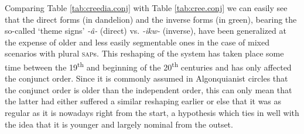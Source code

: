 \documentclass[twoside,a4paper,11pt]{article}
\newcommand{\ipa}[1]{{\phon\textit{#1}}}
\newcommand{\sg}{\textsc{sg}}
\newcommand{\pl}{\textsc{pl}}
\newcommand{\grise}[1]{\cellcolor{lightgray}\textbf{#1}}
\newcommand{\Σ}{\greek{Σ}}
\newcommand{\pli}{\textsc{pi}}
\newcommand{\pe}{\textsc{pe}}
\begin{document}

Comparing Table \vref{tab:creedia.conj} with Table \vref{tab:cree.conj} we can easily see that the direct forms (in dandelion) and the inverse forms (in green), bearing the so-called `theme signs' \textit{-â-} (direct) vs. \textit{-ikw-} (inverse), have been generalized at the expense of older and less easily segmentable ones in the case of mixed scenarios with plural \textsc{sap}s. This reshaping of the system has taken place some time between the 19\textsuperscript{th} and beginning of the 20\textsuperscript{th} centuries and has only affected the conjunct order. Since it is commonly assumed in Algonquianist circles that the conjunct order is older than the independent order, this can only mean that the latter had either suffered a similar reshaping earlier or else that it was as regular as it is nowadays right from the start, a hypothesis which ties in well with the idea that it is younger and largely nominal from the outset.
\end{document}
